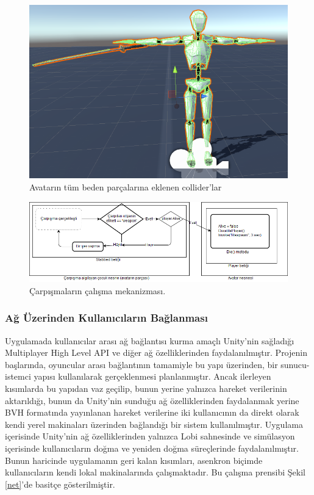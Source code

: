 \documentclass[a4paper, 12pt, titlepage]{article}
\begin{document}
\begin{figure}[ht!]
    \centering
        \includegraphics[width=5in]{images/c2}
    \caption{Avatarın tüm beden parçalarına eklenen collider'lar}
    \label{c}
\end{figure}

\begin{figure}[ht!]
    \centering
        \includegraphics[width=6in]{images/col}
    \caption{Çarpışmaların çalışma mekanizması.}
    \label{col}
\end{figure}

\subsubsection{Ağ Üzerinden Kullanıcıların Bağlanması}
Uygulamada kullanıcılar arası ağ bağlantısı kurma amaçlı Unity’nin sağladığı Multiplayer High
Level API ve diğer ağ özelliklerinden faydalanılmıştır. Projenin başlarında, oyuncular arası
bağlantının tamamiyle bu yapı üzerinden, bir sunucu-istemci yapısı kullanılarak gerçeklenmesi
planlanmıştır. Ancak ilerleyen kısımlarda bu yapıdan vaz geçilip, bunun yerine yalnızca hareket
verilerinin aktarıldığı, bunun da Unity’nin sunduğu ağ özelliklerinden faydalanmak yerine BVH
formatında yayınlanan hareket verilerine iki kullanıcının da direkt olarak kendi yerel
makinaları üzerinden bağlandığı bir sistem kullanılmıştır. Uygulama içerisinde Unity’nin ağ
özelliklerinden yalnızca Lobi sahnesinde ve simülasyon içerisinde kullanıcıların doğma ve yeniden
doğma süreçlerinde faydalanılmıştır. Bunun haricinde uygulamanın geri kalan kısımları, asenkron
biçimde kullanıcıların kendi lokal makinalarında çalışmaktadır. Bu çalışma prensibi Şekil
\ref{net}’de basitçe gösterilmiştir.
\end{document}
